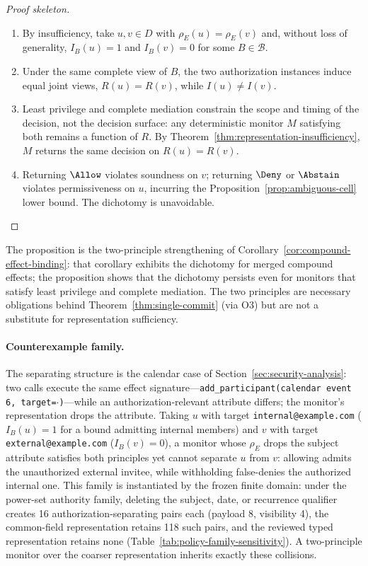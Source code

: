 \begin{proof}[Proof skeleton]
\begin{enumerate}
  \item By insufficiency, take $u,v\in D$ with $\rho_E(u)=\rho_E(v)$ and,
        without loss of generality, $I_B(u)=1$ and $I_B(v)=0$ for some
        $B\in\mathcal{B}$.
  \item Under the same complete view of $B$, the two authorization instances
        induce equal joint views, $R(u)=R(v)$, while $I(u)\neq I(v)$.
  \item Least privilege and complete mediation constrain the scope and timing
        of the decision, not the decision surface: any deterministic monitor
        $M$ satisfying both remains a function of $R$. By
        Theorem~\ref{thm:representation-insufficiency}, $M$ returns the same
        decision on $R(u)=R(v)$.
  \item Returning $\Allow$ violates soundness on $v$; returning $\Deny$ or
        $\Abstain$ violates permissiveness on $u$, incurring the
        Proposition~\ref{prop:ambiguous-cell} lower bound. The dichotomy is
        unavoidable. \qedhere
\end{enumerate}
\end{proof}

The proposition is the two-principle strengthening of
Corollary~\ref{cor:compound-effect-binding}: that corollary exhibits the
dichotomy for merged compound effects; the proposition shows that the
dichotomy persists even for monitors that satisfy least privilege and complete
mediation. The two principles are necessary obligations behind
Theorem~\ref{thm:single-commit} (via O3) but are not a substitute for
representation sufficiency.

\paragraph{Counterexample family.}
The separating structure is the calendar case of
Section~\ref{sec:security-analysis}: two calls execute the same effect
signature---\texttt{add\_participant(calendar event 6, target=}$\cdot$\texttt{)}---while
an authorization-relevant attribute differs; the monitor's representation
drops the attribute. Taking $u$ with target \texttt{internal@example.com}
($I_B(u)=1$ for a bound admitting internal members) and $v$ with target
\texttt{external@example.com} ($I_B(v)=0$), a monitor whose $\rho_E$ drops
the subject attribute satisfies both principles yet cannot separate $u$ from
$v$: allowing admits the unauthorized external invitee, while withholding
false-denies the authorized internal one. This family is instantiated by the
frozen finite domain: under the power-set authority family, deleting the
subject, date, or recurrence qualifier creates 16 authorization-separating
pairs each (payload 8, visibility 4), the common-field representation retains
118 such pairs, and the reviewed typed representation retains none
(Table~\ref{tab:policy-family-sensitivity}). A two-principle monitor over the
coarser representation inherits exactly these collisions.

